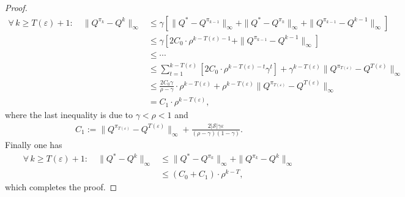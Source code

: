\documentclass[10pt]{article}
\newcommand{\calS}{\mathcal{S}}
\newcommand{\ls}{\left}
\newcommand{\rs}{\right}
\theoremstyle{plain}
\theoremstyle{definition}
\begin{document}
\begin{proof}
\begin{align*}
        \forall\, k\geq T(\varepsilon)+1: \quad \| Q^{\pi_k} - Q^k \|_\infty &\leq \gamma \ls[ \| Q^* - Q^{\pi_{k-1}} \|_\infty + \| Q^* - Q^{\pi_k} \|_\infty + \| Q^{\pi_{k-1}} - Q^{k-1} \|_\infty \rs] \\
        &\leq \gamma \ls[ 2C_0 \cdot \rho^{k-T(\varepsilon)-1} + \| Q^{\pi_{k-1}} - Q^{k-1} \|_\infty \rs] \\
        &\leq \cdots \\
        &\leq \sum_{t=1}^{k-T(\varepsilon)} [2C_0 \cdot \rho^{k-T(\varepsilon)-t} \gamma^t] + \gamma^{k-T(\varepsilon)} \| Q^{\pi_{T(\varepsilon)}} - Q^{T(\varepsilon)} \|_\infty \\
        &\leq \frac{2C_0 \gamma}{\rho-\gamma} \cdot \rho^{k-T(\varepsilon)} + \rho^{k-T(\varepsilon)} \| Q^{\pi_{T(\varepsilon)}} - Q^{T(\varepsilon)} \|_\infty \\
        &= C_1 \cdot \rho^{k-T(\varepsilon)},
    \end{align*}
    where the last inequality is due to $\gamma < \rho < 1$ and 
    \begin{align*}
        C_1 := \| Q^{\pi_{T(\varepsilon)}} - Q^{T(\varepsilon)} \|_\infty + \frac{2|\calS|\gamma \varepsilon}{(\rho-\gamma)(1-\gamma)}.
    \end{align*}
    Finally one has
    \begin{align*}
        \forall\, k\geq T(\varepsilon)+1: \quad \| Q^* - Q^k \|_\infty &\leq \| Q^* - Q^{\pi_k} \|_\infty + \| Q^{\pi_k} - Q^k \|_\infty \\
        &\leq (C_0 + C_1) \cdot \rho^{k-T},
    \end{align*}
    which completes the proof.
\end{proof}
\end{document}
